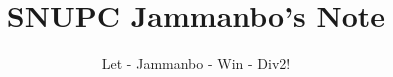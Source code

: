 \documentclass[landscape,8pt]{article}
\title{\textbf{SNUPC Jammanbo's Note}}
\author{Let - Jammanbo - Win - Div2!}
\date{ }
\begin{document}

\end{document}
